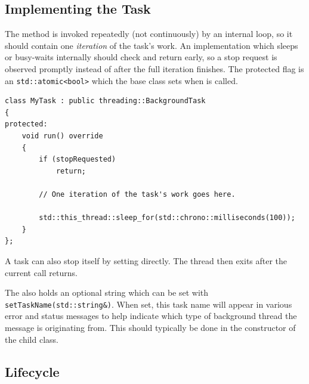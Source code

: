 \subsection{Implementing the Task}

The  method is invoked repeatedly (not continuously) by an internal loop, so it should contain one \textit{iteration} of the task's work. An implementation which sleeps or busy-waits internally should check  and return early, so a stop request is observed promptly instead of after the full iteration finishes. The protected  flag is an \texttt{std::atomic<bool>} which the base class sets when  is called.
\begin{lstlisting}[style=cppstyle]
class MyTask : public threading::BackgroundTask
{
protected:
    void run() override
    {
        if (stopRequested)
            return;

        // One iteration of the task's work goes here.

        std::this_thread::sleep_for(std::chrono::milliseconds(100));
    }
};
\end{lstlisting}
A task can also stop itself by setting  directly. The thread then exits after the current  call returns.

The  also holds an optional  string which can be set with \texttt{setTaskName(std::string\&)}. When set, this task name will appear in various error and status messages to help indicate which type of background thread the message is originating from. This should typically be done in the constructor of the child class.

\subsection{Lifecycle}

